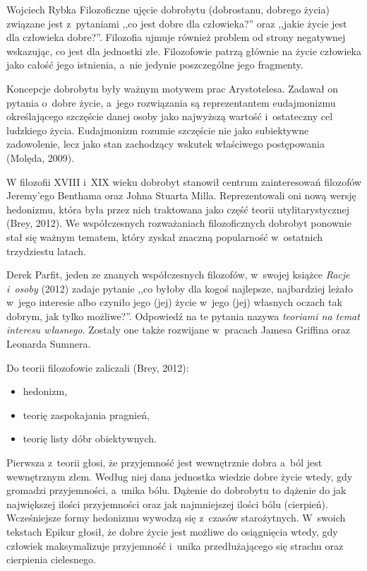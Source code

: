 \begin{artplenv}{Wojciech Rybka}
Filozoficzne ujęcie dobrobytu (dobrostanu, dobrego życia) związane jest z~pytaniami ,,co jest dobre dla człowieka?'' oraz
,,jakie życie jest dla człowieka dobre?''. Filozofia ujmuje również problem od strony negatywnej wskazując, co jest dla
jednostki złe. Filozofowie patrzą głównie na życie człowieka jako całość jego istnienia, a~nie jedynie poszczególne
jego fragmenty. 

Koncepcje dobrobytu były ważnym motywem prac Arystotelesa. Zadawał on pytania o~dobre życie, a~jego rozwiązania są
reprezentantem eudajmonizmu określającego szczęście danej osoby jako najwyższą wartość i~ostateczny cel ludzkiego
życia. Eudajmonizm rozumie szczęście nie jako subiektywne zadowolenie, lecz jako stan zachodzący wskutek właściwego
postępowania \label{ref:RNDJ4IzCcvV2g}(Molęda, 2009). 

W filozofii XVIII i~XIX wieku dobrobyt stanowił centrum zainteresowań filozofów Jeremy'ego Benthama oraz Johna Stuarta
Milla. Reprezentowali oni nową wersję hedonizmu, która była przez nich traktowana jako część teorii utylitarystycznej
\label{ref:RNDdLyKmevkGd}(Brey, 2012). We współczesnych rozważaniach filozoficznych dobrobyt ponownie stał się ważnym
tematem, który zyskał znaczną popularność w~ostatnich trzydziestu latach.

Derek Parfit, jeden ze znanych współczesnych filozofów, w~swojej książce \textit{Racje i~osoby}
\label{ref:RNDlZoiUoryXX}(2012) zadaje pytanie ,,co byłoby dla kogoś najlepsze, najbardziej leżało w~jego interesie
albo czyniło jego (jej) życie w~jego (jej) własnych oczach tak dobrym, jak tylko możliwe?''. Odpowiedź na te pytania
nazywa \textit{teoriami na temat interesu własnego}. Zostały one także rozwijane w~pracach Jamesa Griffina oraz
Leonarda Sumnera. 

Do teorii filozofowie zaliczali \label{ref:RNDer2t8feRbG}(Brey, 2012):

\begin{itemize}
\item hedonizm,
\item teorię zaspokajania pragnień,
\item teorię listy dóbr obiektywnych.
\end{itemize}

Pierwsza z~teorii głosi, że przyjemność jest wewnętrznie dobra a~ból jest wewnętrznym złem. Według niej dana jednostka
wiedzie dobre życie wtedy, gdy gromadzi przyjemności, a~unika bólu. Dążenie do dobrobytu to dążenie do jak największej
ilości przyjemności oraz jak najmniejszej ilości bólu (cierpień). Wcześniejsze formy hedonizmu wywodzą się z~czasów
starożytnych. W~swoich tekstach Epikur głosił, że dobre życie jest możliwe do osiągnięcia wtedy, gdy człowiek
maksymalizuje przyjemność i~unika przedłużającego się strachu oraz cierpienia cielesnego. 


\end{artplenv}

